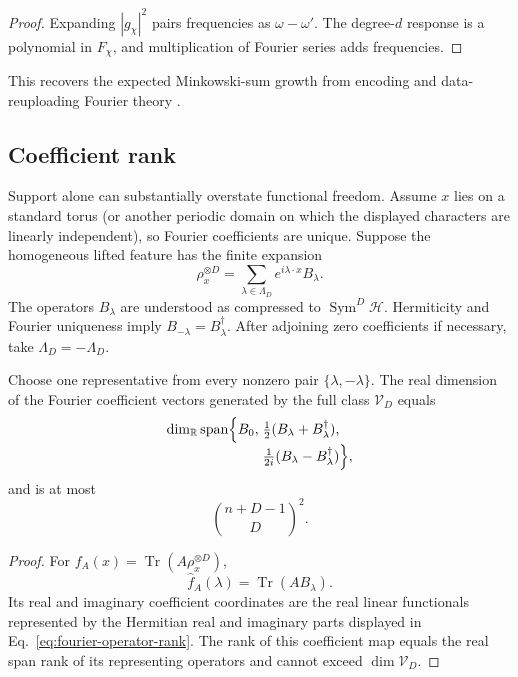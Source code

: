 \documentclass[pdflatex,sn-mathphys,NameDate,iicol]{sn-jnl}
\newcommand{\Tr}{\operatorname{Tr}}
\newcommand{\R}{\mathbb{R}}
\newcommand{\Sym}{\operatorname{Sym}}
\newcommand{\cH}{\mathcal{H}}
\newcommand{\cV}{\mathcal{V}}
\begin{document}
\begin{proof}
Expanding $|g_\chi|^2$ pairs frequencies as
$\omega-\omega'$. The degree-$d$ response is a polynomial in
$F_\chi$, and multiplication of Fourier series adds frequencies.
\end{proof}

This recovers the expected Minkowski-sum growth from encoding and
data-reuploading Fourier theory \citep{schuld2021encoding}.

\subsection{Coefficient rank}

Support alone can substantially overstate functional freedom. Assume $x$
lies on a standard torus (or another periodic domain on which the displayed
characters are linearly independent), so Fourier coefficients are unique.
Suppose the homogeneous lifted feature has the finite expansion
\begin{equation}
  \rho_x^{\otimes D}
  =
  \sum_{\lambda\in\Lambda_D}
  e^{i\lambda\cdot x}B_\lambda.
  \label{eq:lifted-fourier}
\end{equation}
The operators $B_\lambda$ are understood as compressed to
$\Sym^D\cH$. Hermiticity and Fourier uniqueness imply
$B_{-\lambda}=B_\lambda^\dagger$.
After adjoining zero coefficients if necessary, take
$\Lambda_D=-\Lambda_D$.

\begin{proposition}
\label{prop:fourier-rank}
Choose one representative from every nonzero pair
$\{\lambda,-\lambda\}$. The real dimension of the Fourier coefficient
vectors generated by the full class $\cV_D$ equals
\begin{equation}
  \begin{aligned}
  \dim_{\R}\operatorname{span}\Bigl\{
    B_0,\;&
    \tfrac12(B_\lambda+B_\lambda^\dagger),\\[-1mm]
    &\tfrac1{2i}(B_\lambda-B_\lambda^\dagger)
  \Bigr\},
  \end{aligned}
  \label{eq:fourier-operator-rank}
\end{equation}
and is at most
\begin{equation}
  \binom{n+D-1}{D}^{2}.
\end{equation}
\end{proposition}

\begin{proof}
For $f_A(x)=\Tr(A\rho_x^{\otimes D})$,
\begin{equation}
  \widehat f_A(\lambda)=\Tr(AB_\lambda).
\end{equation}
Its real and imaginary coefficient coordinates are the real linear
functionals represented by the Hermitian real and imaginary parts displayed
in Eq.~\eqref{eq:fourier-operator-rank}. The rank of this coefficient map
equals the real span rank of its representing operators and cannot exceed
$\dim\cV_D$.
\end{proof}
\end{document}
